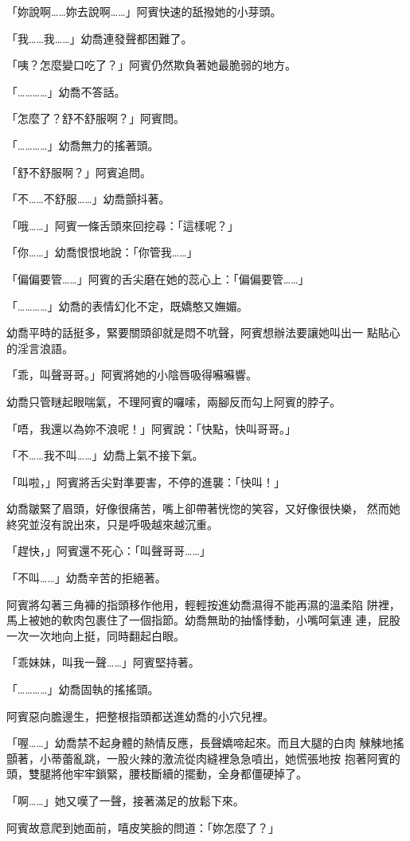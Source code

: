 「妳說啊……妳去說啊……」阿賓快速的舐撥她的小芽頭。

「我……我……」幼喬連發聲都困難了。

「咦？怎麼變口吃了？」阿賓仍然欺負著她最脆弱的地方。

「…………」幼喬不答話。

「怎麼了？舒不舒服啊？」阿賓問。

「…………」幼喬無力的搖著頭。

「舒不舒服啊？」阿賓追問。

「不……不舒服……」幼喬顫抖著。

「哦……」阿賓一條舌頭來回挖尋：「這樣呢？」

「你……」幼喬恨恨地說：「你管我……」

「偏偏要管……」阿賓的舌尖磨在她的蕊心上：「偏偏要管……」

「…………」幼喬的表情幻化不定，既嬌憨又嫵媚。

幼喬平時的話挺多，緊要關頭卻就是悶不吭聲，阿賓想辦法要讓她叫出一
點貼心的淫言浪語。

「乖，叫聲哥哥。」阿賓將她的小陰唇吸得囌囌響。

幼喬只管瞇起眼喘氣，不理阿賓的囉嗦，兩腳反而勾上阿賓的脖子。

「唔，我還以為妳不浪呢！」阿賓說：「快點，快叫哥哥。」

「不……我不叫……」幼喬上氣不接下氣。

「叫啦，」阿賓將舌尖對準要害，不停的進襲：「快叫！」

幼喬皺緊了眉頭，好像很痛苦，嘴上卻帶著恍惚的笑容，又好像很快樂，
然而她終究並沒有說出來，只是呼吸越來越沉重。

「趕快，」阿賓還不死心：「叫聲哥哥……」

「不叫……」幼喬辛苦的拒絕著。

阿賓將勾著三角褲的指頭移作他用，輕輕按進幼喬濕得不能再濕的溫柔陷
阱裡，馬上被她的軟肉包裹住了一個指節。幼喬無助的抽慉悸動，小嘴呵氣連
連，屁股一次一次地向上挺，同時翻起白眼。

「乖妹妹，叫我一聲……」阿賓堅持著。

「…………」幼喬固執的搖搖頭。

阿賓惡向膽邊生，把整根指頭都送進幼喬的小穴兒裡。

「喔……」幼喬禁不起身體的熱情反應，長聲嬌啼起來。而且大腿的白肉
觫觫地搖顫著，小蒂蕾亂跳，一股火辣的激流從肉縫裡急急噴出，她慌張地按
抱著阿賓的頭，雙腿將他牢牢鎖緊，腰枝斷續的擺動，全身都僵硬掉了。

「啊……」她又嘆了一聲，接著滿足的放鬆下來。

阿賓故意爬到她面前，嘻皮笑臉的問道：「妳怎麼了？」

